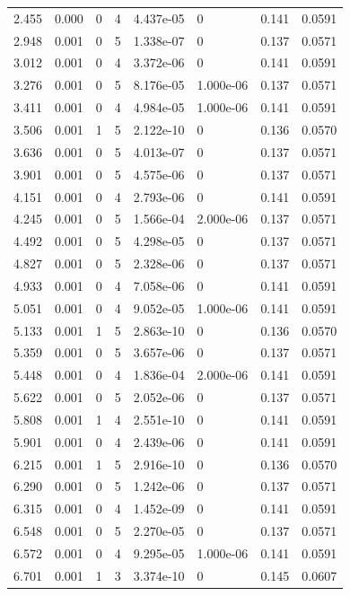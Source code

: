 \documentclass[preview]{standalone}
\begin{document}
{{\begin{tabular}{L{1.2cm}C{1.2cm} C{0.3cm}C{0.5cm} C{1.4cm}C{1.4cm} C{1.4cm}C{1.4cm}}
  2.455  &  0.000  & 0     &  4 &  4.437e-05  & 0  & 0.141 &  0.0591   \\ 
  2.948  &  0.001  & 0     &  5 &  1.338e-07  & 0  & 0.137 &  0.0571   \\ 
  3.012  &  0.001  & 0     &  4 &  3.372e-06  & 0  & 0.141 &  0.0591   \\ 
  3.276  &  0.001  & 0     &  5 &  8.176e-05  & 1.000e-06  & 0.137 &  0.0571   \\ 
  3.411  &  0.001  & 0     &  4 &  4.984e-05  & 1.000e-06  & 0.141 &  0.0591   \\ 
  3.506  &  0.001  & 1     &  5 &  2.122e-10  & 0  & 0.136 &  0.0570   \\ 
  3.636  &  0.001  & 0     &  5 &  4.013e-07  & 0  & 0.137 &  0.0571   \\ 
  3.901  &  0.001  & 0     &  5 &  4.575e-06  & 0  & 0.137 &  0.0571   \\ 
  4.151  &  0.001  & 0     &  4 &  2.793e-06  & 0  & 0.141 &  0.0591   \\ 
  4.245  &  0.001  & 0     &  5 &  1.566e-04  & 2.000e-06  & 0.137 &  0.0571   \\ 
  4.492  &  0.001  & 0     &  5 &  4.298e-05  & 0  & 0.137 &  0.0571   \\ 
  4.827  &  0.001  & 0     &  5 &  2.328e-06  & 0  & 0.137 &  0.0571   \\ 
  4.933  &  0.001  & 0     &  4 &  7.058e-06  & 0  & 0.141 &  0.0591   \\ 
  5.051  &  0.001  & 0     &  4 &  9.052e-05  & 1.000e-06  & 0.141 &  0.0591   \\ 
  5.133  &  0.001  & 1     &  5 &  2.863e-10  & 0  & 0.136 &  0.0570   \\ 
  5.359  &  0.001  & 0     &  5 &  3.657e-06  & 0  & 0.137 &  0.0571   \\ 
  5.448  &  0.001  & 0     &  4 &  1.836e-04  & 2.000e-06  & 0.141 &  0.0591   \\ 
  5.622  &  0.001  & 0     &  5 &  2.052e-06  & 0  & 0.137 &  0.0571   \\ 
  5.808  &  0.001  & 1     &  4 &  2.551e-10  & 0  & 0.141 &  0.0591   \\ 
  5.901  &  0.001  & 0     &  4 &  2.439e-06  & 0  & 0.141 &  0.0591   \\ 
  6.215  &  0.001  & 1     &  5 &  2.916e-10  & 0  & 0.136 &  0.0570   \\ 
  6.290  &  0.001  & 0     &  5 &  1.242e-06  & 0  & 0.137 &  0.0571   \\ 
  6.315  &  0.001  & 0     &  4 &  1.452e-09  & 0  & 0.141 &  0.0591   \\ 
  6.548  &  0.001  & 0     &  5 &  2.270e-05  & 0  & 0.137 &  0.0571   \\ 
  6.572  &  0.001  & 0     &  4 &  9.295e-05  & 1.000e-06  & 0.141 &  0.0591   \\ 
  6.701  &  0.001  & 1     &  3 &  3.374e-10  & 0  & 0.145 &  0.0607   \\ 
\hline 
\end{tabular} 

}}
\end{document}
